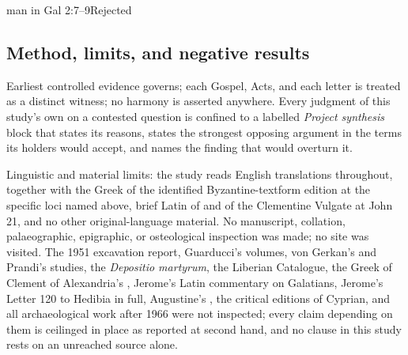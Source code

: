\begin{traditionaudit}
{man in Gal 2:7--9}{Rejected}
\end{traditionaudit}

\subsection{Method, limits, and negative results}

Earliest controlled evidence governs; each Gospel, Acts, and each letter
is treated as a distinct witness; no harmony is asserted anywhere. Every
judgment of this study's own on a contested question is confined to a
labelled \emph{Project synthesis} block that states its reasons, states the
strongest opposing argument in the terms its holders would accept, and names
the finding that would overturn it.

Linguistic and material limits: the study reads English translations
throughout, together with the Greek of the identified Byzantine-textform
edition at the specific loci named above, brief Latin of  and of the Clementine Vulgate at John 21, and no other
original-language material. No manuscript, collation, palaeographic,
epigraphic, or osteological inspection was made; no site was visited. The
1951 excavation report, Guarducci's volumes, von Gerkan's and Prandi's
studies, the \textit{Depositio martyrum}, the Liberian Catalogue, the Greek
of Clement of Alexandria's , Jerome's Latin commentary on
Galatians, Jerome's Letter 120 to Hedibia in full, Augustine's
, the critical editions of Cyprian, and all
archaeological work after 1966 were not inspected; every claim depending on
them is ceilinged in place as reported at second hand, and no clause in this
study rests on an unreached source alone.

